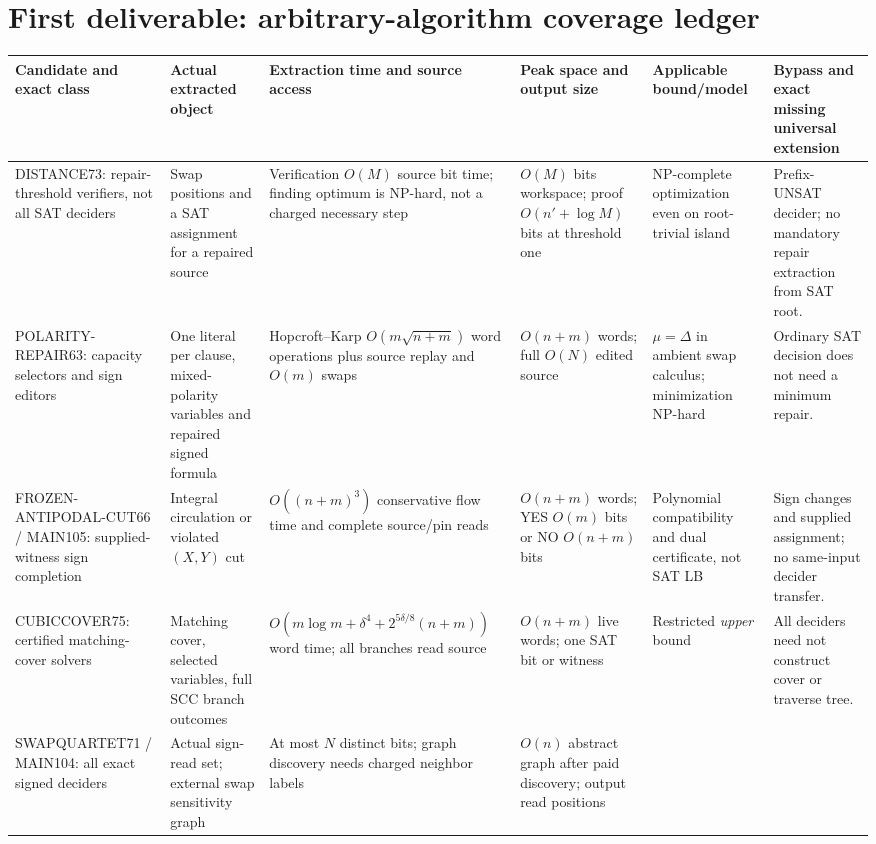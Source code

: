 \documentclass[11pt]{article}
\begin{document}
\section{First deliverable: arbitrary-algorithm coverage ledger}
\scriptsize
\begin{longtable}{@{}p{.14\linewidth}p{.14\linewidth}p{.175\linewidth}p{.155\linewidth}p{.17\linewidth}p{.14\linewidth}@{}}
\toprule
Candidate and exact class & Actual extracted object & Extraction time and source access & Peak space and output size & Applicable bound/model & Bypass and exact missing universal extension\\
\midrule\endhead
DISTANCE73: repair-threshold verifiers, not all SAT deciders &
Swap positions and a SAT assignment for a repaired source &
Verification \(O(M)\) source bit time; finding optimum is NP-hard, not a charged necessary step &
\(O(M)\) bits workspace; proof \(O(n'\!+\!\log M)\) bits at threshold one &
NP-complete optimization even on root-trivial island &
Prefix-UNSAT decider; no mandatory repair extraction from SAT root.\\
POLARITY-REPAIR63: capacity selectors and sign editors &
One literal per clause, mixed-polarity variables and repaired signed formula &
Hopcroft--Karp \(O(m\sqrt{n+m})\) word operations plus source replay and \(O(m)\) swaps &
\(O(n+m)\) words; full \(O(N)\) edited source &
\(\mu=\Delta\) in ambient swap calculus; minimization NP-hard &
Ordinary SAT decision does not need a minimum repair.\\
FROZEN-ANTIPODAL-CUT66 / MAIN105: supplied-witness sign completion &
Integral circulation or violated \((X,Y)\) cut &
\(O((n+m)^3)\) conservative flow time and complete source/pin reads &
\(O(n+m)\) words; YES \(O(m)\) bits or NO \(O(n+m)\) bits &
Polynomial compatibility and dual certificate, not SAT LB &
Sign changes and supplied assignment; no same-input decider transfer.\\
CUBICCOVER75: certified matching-cover solvers &
Matching cover, selected variables, full SCC branch outcomes &
\(O(m\log m+\delta^4+2^{5\delta/8}(n+m))\) word time; all branches read source &
\(O(n+m)\) live words; one SAT bit or witness &
Restricted \emph{upper} bound &
All deciders need not construct cover or traverse tree.\\
SWAPQUARTET71 / MAIN104: all exact signed deciders &
Actual sign-read set; external swap sensitivity graph &
At most \(N\) distinct bits; graph discovery needs charged neighbor labels &
\(O(n)\) abstract graph after paid discovery; output read positions &

\end{longtable}
\end{document}
